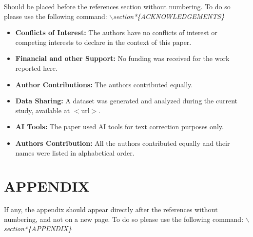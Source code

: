 \documentclass[a4paper,twoside]{article}
\begin{document}
Should be placed before the references section without numbering. To do so please use the following command:
\textit{$\backslash$section*\{ACKNOWLEDGEMENTS\}}
\begin{itemize}
  \item \textbf{Conflicts of Interest:} The authors have no conflicts of interest or competing interests to declare in the context of this paper.
  \item \textbf{Financial and other Support:} No funding was received for the work reported here.
  \item \textbf{Author Contributions:} The authors contributed equally.
  \item \textbf{Data Sharing:} A dataset was generated and analyzed during the current study, available at $<$url$>$.
  \item \textbf{AI Tools:} The paper used AI tools for text correction purposes only.
  \item \textbf{Authors Contribution:} All the authors contributed equally and their names were listed in alphabetical order.
\end{itemize}



{\small
}


\section*{\uppercase{Appendix}}

If any, the appendix should appear directly after the references without numbering, and not on a new page. To do so please use the following command: \textit{$\backslash$section*\{APPENDIX\}}
\end{document}
